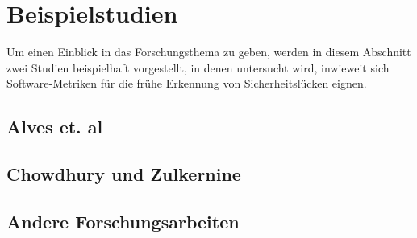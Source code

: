 \section{Beispielstudien}
\label{sec:studien}
Um einen Einblick in das Forschungsthema zu geben, werden in diesem Abschnitt zwei Studien beispielhaft vorgestellt, in denen untersucht wird, inwieweit sich Software-Metriken für die frühe Erkennung von Sicherheitslücken eignen.


\subsection{Alves et. al}

\subsection{Chowdhury und Zulkernine}

\subsection{Andere Forschungsarbeiten}
